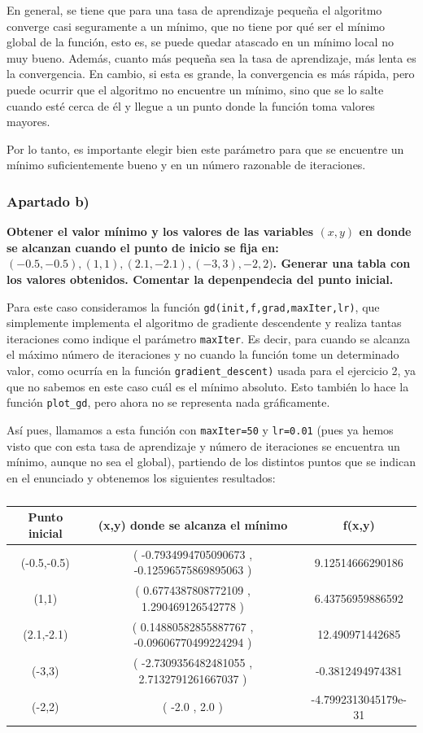 \documentclass[a4]{article}
\begin{document}
En general, se tiene que para una tasa de aprendizaje pequeña el algoritmo converge casi seguramente a un mínimo, que no tiene por qué ser el mínimo global de la función, esto es, se puede quedar atascado en un mínimo local no muy bueno. Además, cuanto más pequeña sea la tasa de aprendizaje, más lenta es la convergencia. En cambio, si esta es grande, la convergencia es más rápida, pero puede ocurrir que el algoritmo no encuentre un mínimo, sino que se lo salte cuando esté cerca de él y llegue a un punto donde la función toma valores mayores. 

Por lo tanto, es importante elegir bien este parámetro para que se encuentre un mínimo suficientemente bueno y en un número razonable de iteraciones. 
\subsubsection{Apartado b)}

\textbf{Obtener el valor mínimo y los valores de las variables $(x, y)$ en donde se alcanzan
cuando el punto de inicio se fija en: $(-0.5, -0.5),(1, 1), (2.1, -2.1),(-3, 3),-2, 2)$.
Generar una tabla con los valores obtenidos. Comentar la depenpendecia del punto
inicial.}

Para este caso consideramos la función \lstinline|gd(init,f,grad,maxIter,lr)|, que simplemente implementa el algoritmo de gradiente descendente y realiza tantas iteraciones como indique el parámetro \lstinline|maxIter|. Es decir, para cuando se alcanza el máximo número de iteraciones y no cuando la función tome un determinado valor, como ocurría en la función  \lstinline|gradient_descent)| usada para el ejercicio 2, ya que no sabemos en este caso cuál es el mínimo absoluto. Esto también lo hace la función \lstinline|plot_gd|, pero ahora no se representa nada gráficamente.

Así pues, llamamos a esta función con \lstinline|maxIter=50| y \lstinline|lr=0.01| (pues ya hemos visto que con esta tasa de aprendizaje y número de iteraciones se encuentra un mínimo, aunque no sea el global), partiendo de los distintos puntos que se indican en el enunciado y obtenemos los siguientes resultados:

\begin{table}[H]
	\centering
	\caption{}
	\begin{tabular}{|c|c|c|}
		\hline
		\textbf{Punto inicial } & \textbf{(x,y) donde se alcanza el mínimo} & \textbf{f(x,y)} \\ \hline
		(-0.5,-0.5) &  ( -0.7934994705090673 , -0.12596575869895063 ) & 9.12514666290186 \\ \hline
		(1,1) &  ( 0.6774387808772109 , 1.290469126542778 ) & 6.43756959886592 \\ \hline
		(2.1,-2.1) &  ( 0.14880582855887767 , -0.09606770499224294 ) & 12.490971442685 \\ \hline
		(-3,3) &  ( -2.7309356482481055 , 2.7132791261667037 ) & -0.3812494974381 \\ \hline
		(-2,2) &  ( -2.0 , 2.0 ) & -4.7992313045179e-31 \\ \hline
	\end{tabular}
	\label{}
\end{table}
\end{document}
